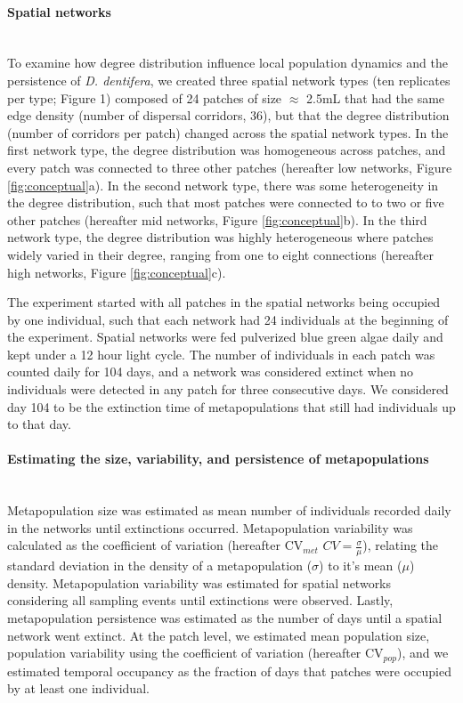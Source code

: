 \paragraph*{Spatial networks}\mbox{}\\
To examine how degree distribution influence local population dynamics and the persistence of \textit{D. dentifera}, we created three spatial network types (ten replicates per type; Figure 1) composed of 24 patches of size $\approx$ 2.5mL that had the same edge density (number of dispersal corridors, 36), but that the degree distribution (number of corridors per patch) changed across the spatial network types. In the first network type, the degree distribution was homogeneous across patches, and every patch was connected to three other patches (hereafter low networks, Figure \ref{fig:conceptual}a). In the second network type, there was some heterogeneity in the degree distribution, such that most patches were connected to to two or five other patches (hereafter mid networks, Figure \ref{fig:conceptual}b). In the third network type, the degree distribution was highly heterogeneous where patches widely varied in their degree, ranging from one to eight connections (hereafter high networks, Figure \ref{fig:conceptual}c).
 
The experiment started with all patches in the spatial networks being occupied by one individual, such that each network had 24 individuals at the beginning of the experiment. Spatial networks were fed pulverized blue green algae daily and kept under a 12 hour light cycle. The number of individuals in each patch was counted daily for 104 days, and a network was considered extinct when no individuals were detected in any patch for three consecutive days. We considered day 104 to be the extinction time of metapopulations that still had individuals up to that day. 
 
\paragraph*{Estimating the size, variability, and persistence of metapopulations}\mbox{}\\
Metapopulation size was estimated as mean number of individuals recorded daily in the networks until extinctions occurred. Metapopulation variability was calculated as the coefficient of variation
(hereafter CV$_{met}$ $CV = \frac{\sigma}{\mu}$), relating the standard deviation in the density of a metapopulation ($\sigma$) to it's mean ($\mu$) density. Metapopulation variability was estimated for spatial networks considering all sampling events until extinctions were observed. Lastly, metapopulation persistence was estimated as the number of days until a spatial network went extinct. At the patch level, we estimated mean population size, population variability using the coefficient of variation (hereafter CV$_{pop}$), and we estimated temporal occupancy as the fraction of days that patches were occupied by at least one individual. 


